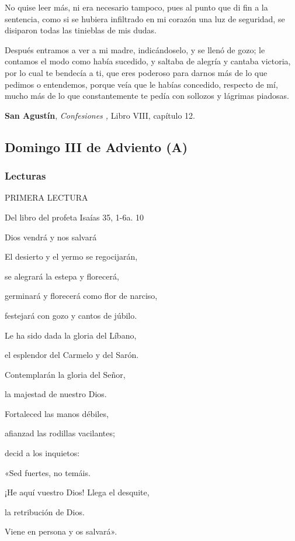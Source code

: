 \documentclass[]{article}
\begin{document}
No quise leer más, ni era necesario tampoco, pues al punto que di fin a
la sentencia, como si se hubiera infiltrado en mi corazón una luz de
seguridad, se disiparon todas las tinieblas de mis dudas.

Después entramos a ver a mi madre, indicándoselo, y se llenó de gozo; le
contamos el modo como había sucedido, y saltaba de alegría y cantaba
victoria, por lo cual te bendecía a ti, que eres poderoso para darnos
más de lo que pedimos o entendemos, porque veía que le habías concedido,
respecto de mí, mucho más de lo que constantemente te pedía con sollozos
y lágrimas piadosas.

\textbf{San Agustín}, \emph{Confesiones ,} Libro VIII, capítulo 12.

\subsection{Domingo III de Adviento
(A)}\label{domingo-iii-de-adviento-a}

\subsubsection{Lecturas}\label{lecturas-2}

PRIMERA LECTURA

Del libro del profeta Isaías 35, 1-6a. 10

Dios vendrá y nos salvará

El desierto y el yermo se regocijarán,

se alegrará la estepa y florecerá,

germinará y florecerá como flor de narciso,

festejará con gozo y cantos de júbilo.

Le ha sido dada la gloria del Líbano,

el esplendor del Carmelo y del Sarón.

Contemplarán la gloria del Señor,

la majestad de nuestro Dios.

Fortaleced las manos débiles,

afianzad las rodillas vacilantes;

decid a los inquietos:

«Sed fuertes, no temáis.

¡He aquí vuestro Dios! Llega el desquite,

la retribución de Dios.

Viene en persona y os salvará».
\end{document}
